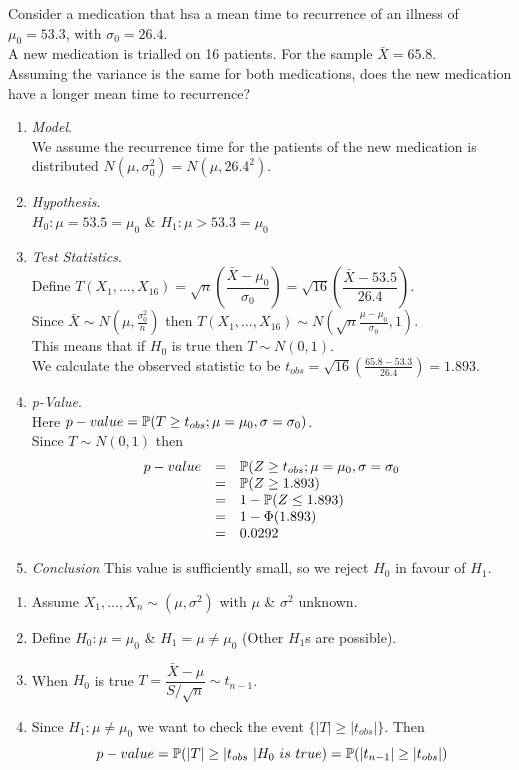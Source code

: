 \documentclass[11pt,a4paper]{article}
\begin{document}
Consider a medication that hsa a mean time to recurrence of an illness of $\mu_0=53.3$, with $\sigma_0=26.4$.\\
A new medication is trialled on 16 patients. For the sample $\bar{X}=65.8$.\\
Assuming the variance is the same for both medications, does the new medication have a longer mean time to recurrence?
\begin{enumerate}[label=\roman*)]
	\item \textit{Model}.\\
	We assume the recurrence time for the patients of the new medication is distributed $N(\mu,\sigma_0^2)=N(\mu,26.4^2)$.
	\item \textit{Hypothesis}.\\
	$H_0:\mu=53.5=\mu_0$ \& $H_1:\mu>53.3=\mu_0$
	\item\textit{Test Statistics}.\\
	Define $T(X_1,\dots,X_{16})=\sqrt{n}\left(\dfrac{\bar{X}-\mu_0}{\sigma_0}\right)=\sqrt{16}\left(\dfrac{\bar{X}-53.5}{26.4}\right)$.\\
	Since $\bar{X}\sim N(\mu,\frac{\sigma_0^2}{n})$ then $T(X_1,\dots,X_{16})\sim N\left(\sqrt{n}\frac{\mu-\mu_0}{\sigma_0},1\right)$.\\
	This means that if $H_0$ is true then $T\sim N(0,1)$.\\
	We calculate the observed statistic to be $t_{obs}=\sqrt{16}\left(\frac{65.8-53.3}{26.4}\right)=1.893$.
	\item\textit{p-Value}.\\
	Here $p-value=\mathbb{P}(T\geq t_{obs};\mu=\mu_0,\sigma=\sigma_0)$.\\
	Since $T\sim N(0,1)$ then
	\[\begin{array}{rcl}
	p-value&=&\mathbb{P}(Z\geq t_{obs};\mu=\mu_0,\sigma=\sigma_0\\
	&=&\mathbb{P}(Z\geq1.893)\\
	&=&1-\mathbb{P}(Z\leq1.893)\\
	&=&1-\Phi(1.893)\\
	&=&0.0292
	\end{array}\]
	\item\textit{Conclusion}
	This value is sufficiently small, so we reject $H_0$ in favour of $H_1$.\\
\end{enumerate}

\begin{enumerate}[label=\roman*)]
	\item Assume $X_1,\dots,X_n\sim(\mu,\sigma^2)$ with $\mu$ \& $\sigma^2$ unknown.
	\item Define $H_0:\mu=\mu_0$ \& $H_1=\mu\neq\mu_0$ (Other $H_1$s are possible).
	\item When $H_0$ is true $T=\dfrac{\bar{X}-\mu}{S/\sqrt{n}}\sim t_{n-1}$.
	\item Since $H_1:\mu\neq\mu_0$ we want to check the event $\{|T|\geq|t_{obs}|\}$. Then
	$$p-value=\prob(|T|\geq|t_{obs}\ |H_0\ is\ true)=\prob(|t_{n-1}|\geq|t_{obs}|) $$
\end{enumerate}
\end{document}
